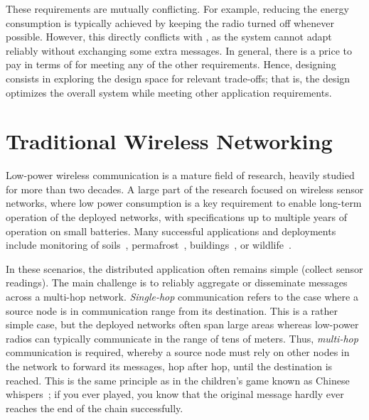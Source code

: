 These requirements are mutually conflicting. For example, reducing the energy consumption is typically achieved by keeping the radio turned off whenever possible.
However, this directly conflicts with , as the system cannot adapt reliably without exchanging some extra messages.
In general, there is a price to pay in terms of  for meeting any of the other requirements.
Hence, designing \CPS consists in exploring the design space for relevant trade-offs; that is, the design optimizes the overall system  while meeting other application requirements.



\section{Traditional Wireless Networking}
\label{sec:traditionalNetworking}

Low-power wireless communication is a mature field of research, heavily studied for more than two decades.
A large part of the research focused on wireless sensor networks, where low power consumption is a key requirement to enable long-term operation of the deployed networks, with specifications up to multiple years of operation on small batteries.
Many successful applications and deployments include monitoring of soils~\cite{geissdoerfer2019PREAct}, permafrost~\cite{weber2019decade}, buildings~\cite{chintalapudi2006Monitoring}, or wildlife~\cite{cassens2019Bursting, zhang2004Zebranet}.

In these scenarios, the distributed application often remains simple (\eg collect sensor readings).
The main challenge is to reliably aggregate or disseminate messages across a multi-hop network.
\emph{Single-hop} communication refers to the case where a source node is in communication range from its destination. This is a rather simple case, but the deployed networks often span large areas whereas low-power radios can typically communicate in the range of tens of meters.
Thus, \emph{multi-hop} communication is required, whereby a source node must rely on other nodes in the network to forward its messages, hop after hop, until the destination is reached.%
%
{This is the same principle as in the children's game known as Chinese whispers~\cite{ChineseWhispers}; if you ever played, you know that the original message hardly ever reaches the end of the chain successfully.}
%


